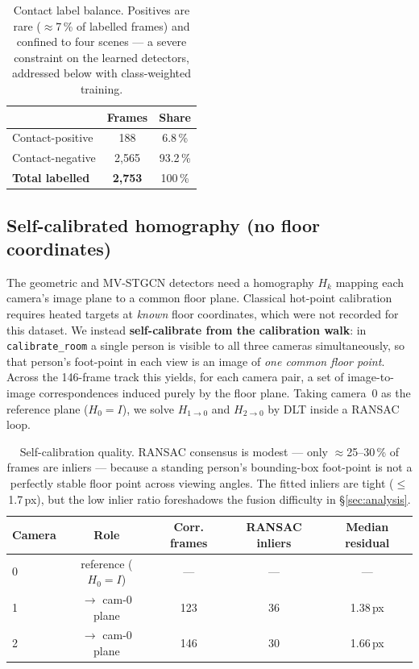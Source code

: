 \documentclass[11pt, a4paper]{article}
\begin{document}
\begin{table}[H]
\centering
\caption{Contact label balance. Positives are rare ($\approx$7\,\% of labelled
frames) and confined to four scenes --- a severe constraint on the learned
detectors, addressed below with class-weighted training.}
\renewcommand{\arraystretch}{1.3}
\begin{tabular}{lcc}
\toprule
 & \textbf{Frames} & \textbf{Share} \\
\midrule
Contact-positive & 188   & 6.8\,\% \\
Contact-negative & 2{,}565 & 93.2\,\% \\
\textbf{Total labelled} & \textbf{2{,}753} & 100\,\% \\
\bottomrule
\end{tabular}
\end{table}

\subsection{Self-calibrated homography (no floor coordinates)}
\label{sec:homography}
The geometric and MV-STGCN detectors need a homography $H_k$ mapping each
camera's image plane to a common floor plane. Classical hot-point calibration
requires heated targets at \emph{known} floor coordinates, which were not
recorded for this dataset. We instead \textbf{self-calibrate from the
calibration walk}: in \texttt{calibrate\_room} a single person is visible to all
three cameras simultaneously, so that person's foot-point in each view is an
image of \emph{one common floor point}. Across the 146-frame track this yields,
for each camera pair, a set of image-to-image correspondences induced purely by
the floor plane. Taking camera~0 as the reference plane ($H_0=I$), we solve
$H_{1\to0}$ and $H_{2\to0}$ by DLT inside a RANSAC loop.

\begin{table}[H]
\centering
\caption{Self-calibration quality. RANSAC consensus is modest --- only
$\approx$25--30\,\% of frames are inliers --- because a standing person's
bounding-box foot-point is not a perfectly stable floor point across viewing
angles. The fitted inliers are tight ($\le$1.7\,px), but the low inlier ratio
foreshadows the fusion difficulty in \S\ref{sec:analysis}.}
\renewcommand{\arraystretch}{1.3}
\begin{tabular}{lcccc}
\toprule
\textbf{Camera} & \textbf{Role} & \textbf{Corr. frames} & \textbf{RANSAC inliers}
    & \textbf{Median residual} \\
\midrule
0 & reference ($H_0=I$) & ---  & ---     & --- \\
1 & $\to$ cam-0 plane   & 123  & 36      & 1.38\,px \\
2 & $\to$ cam-0 plane   & 146  & 30      & 1.66\,px \\
\bottomrule
\end{tabular}
\end{table}
\end{document}

